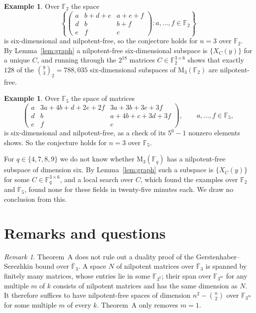 \documentclass[11pt]{amsart}
\theoremstyle{definition}
\newtheorem{example}[theorem]{Example}
\theoremstyle{remark}
\newtheorem{remark}[theorem]{Remark}
\numberwithin{equation}{section}
\newcommand{\F}{\mathbb{F}}
\newcommand{\M}{\mathrm{M}}
\begin{document}
\begin{example}\label{ex:F2}
Over $\F_2$ the space
\[
\left\{\begin{pmatrix} a&b+d+e&a+e+f\\ d&b&b+f\\ e&f&c\end{pmatrix} : a,\dots,f\in\F_2\right\}
\]
is six-dimensional and nilpotent-free, so the conjecture holds for $n=3$ over $\F_2$. By Lemma~\ref{lem:graph} a nilpotent-free six-dimensional subspace is $\{X_C(y)\}$ for a unique $C$, and running through the $2^{18}$ matrices $C\in\F_2^{3\times6}$ shows that exactly $128$ of the $\binom93_2=788{,}035$ six-dimensional subspaces of $\M_3(\F_2)$ are nilpotent-free.
\end{example}

\begin{example}\label{ex:F5}
Over $\F_5$ the space of matrices
\[
\begin{pmatrix} a&3a+4b+d+2e+2f&3a+3b+3e+3f\\ d&b&a+4b+c+3d+3f\\ e&f&c\end{pmatrix},\qquad a,\dots,f\in\F_5,
\]
is six-dimensional and nilpotent-free, as a check of its $5^6-1$ nonzero elements shows. So the conjecture holds for $n=3$ over $\F_5$.
\end{example}

For $q\in\{4,7,8,9\}$ we do not know whether $\M_3(\F_q)$ has a nilpotent-free subspace of dimension six. By Lemma~\ref{lem:graph} such a subspace is $\{X_C(y)\}$ for some $C\in\F_q^{3\times6}$, and a local search over $C$, which found the examples over $\F_2$ and $\F_5$, found none for these fields in twenty-five minutes each. We draw no conclusion from this.

\section{Remarks and questions}\label{sec:questions}

\begin{remark}\label{rem:transfer}
Theorem~A does not rule out a duality proof of the Gerstenhaber--Serezhkin bound over $\overline{\F}_3$. A space $N$ of nilpotent matrices over $\overline{\F}_3$ is spanned by finitely many matrices, whose entries lie in some $\F_{3^k}$; their span over $\F_{3^m}$ for any multiple $m$ of $k$ consists of nilpotent matrices and has the same dimension as $N$. It therefore suffices to have nilpotent-free spaces of dimension $n^2-\binom n2$ over $\F_{3^m}$ for some multiple $m$ of every $k$. Theorem~A only removes $m=1$.
\end{remark}
\end{document}
